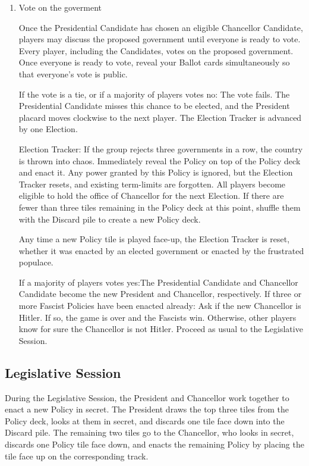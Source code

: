 \documentclass[13pt,a4paper,twocolumn,titlepage]{scrartcl}
\begin{document}
\begin{enumerate}
		\item \textcolor{Blue3}{Vote on the goverment}
		
		Once the Presidential Candidate has chosen an eligible Chancellor Candidate, players may	discuss the proposed government until everyone is ready to vote. Every player, including the Candidates, votes on the proposed government. Once everyone is ready to vote, reveal your Ballot cards simultaneously so that everyone’s vote is public.
		
		\textcolor{Blue3}{If the vote is a tie, or if a majority of players votes no:} The vote fails. The Presidential Candidate misses this chance to be elected, and the President placard moves clockwise to the next	player. The Election Tracker is advanced by	one Election.
		
		\textcolor{Blue3}{Election Tracker:} If the group rejects three governments in a row, the country is thrown into	chaos. Immediately reveal the Policy on top of the Policy deck and enact it. Any power granted by this Policy is ignored, but the Election Tracker resets, and existing term-limits are forgotten. All players become eligible to hold	the office of Chancellor for the next Election. If there are fewer than three tiles remaining in the Policy deck at this point, shuffle them with the Discard pile to create a new Policy deck.
		
		Any time a new Policy tile is played face-up, the Election Tracker is reset, whether it was enacted by an elected government or enacted by the frustrated populace.
		
		\textcolor{Blue3}{If a majority of players votes yes:}​ The Presidential Candidate and Chancellor Candidate become the new President and Chancellor, respectively. \textcolor{Blue3}{If three or more \textcolor{fascist}{Fascist} Policies have been enacted already:} Ask if the new Chancellor is \textcolor{fascist}{Hitler}. If so, the game is over and the \textcolor{fascist}{Fascists} win. Otherwise, other players know for sure the	Chancellor is not \textcolor{fascist}{Hitler}. Proceed as usual to the Legislative Session.	
	\end{enumerate}
	
	\subsection*{Legislative Session}
	During the Legislative Session, the President and Chancellor work together to enact a new Policy in secret. The President draws the top three tiles from the Policy deck, looks at them in secret, and discards one tile face down into the Discard pile. The remaining two tiles go to the Chancellor, who looks in secret, discards one Policy tile face down, and enacts the	remaining Policy by placing the tile face up on the corresponding track.
	
\end{document}

